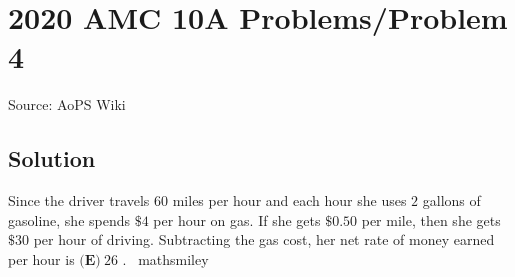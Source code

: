 \documentclass[12pt]{article}
\begin{document}
\section*{{2020 AMC 10A Problems/Problem 4}}
Source: AoPS Wiki

\subsection*{Solution}
Since the driver travels $60$ miles per hour and each hour she uses $2$ gallons of gasoline, she spends $\$4$ per hour on gas. If she gets $\$0.50$ per mile, then she gets $\$30$ per hour of driving. Subtracting the gas cost, her net rate of money earned per hour is $\boxed{\textbf{(E)}\ 26}$ .
~mathsmiley
\end{document}
